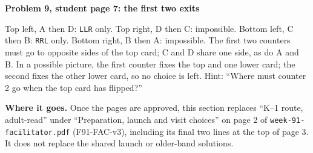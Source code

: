 \documentclass[11pt]{article}
\newcommand{\sub}[1]{\par\textbf{#1}\par}
\newcommand{\code}[1]{\texttt{#1}}
\begin{document}
\sub{Problem 9, student page 7: the first two exits}
Top left, A then D: \code{LLR} only. Top right, D then C: impossible. Bottom left, C then B: \code{RRL} only. Bottom right, B then A: impossible. The first two counters must go to opposite sides of the top card; C and D share one side, as do A and B. In a possible picture, the first counter fixes the top and one lower card; the second fixes the other lower card, so no choice is left. Hint: ``Where must counter 2 go when the top card has flipped?''

\textbf{Where it goes.} Once the pages are approved, this section replaces ``K--1 route, adult-read'' under ``Preparation, launch and visit choices'' on page 2 of \code{week-91-facilitator.pdf} (F91-FAC-v3), including its final two lines at the top of page 3. It does not replace the shared launch or older-band solutions.
\end{document}
